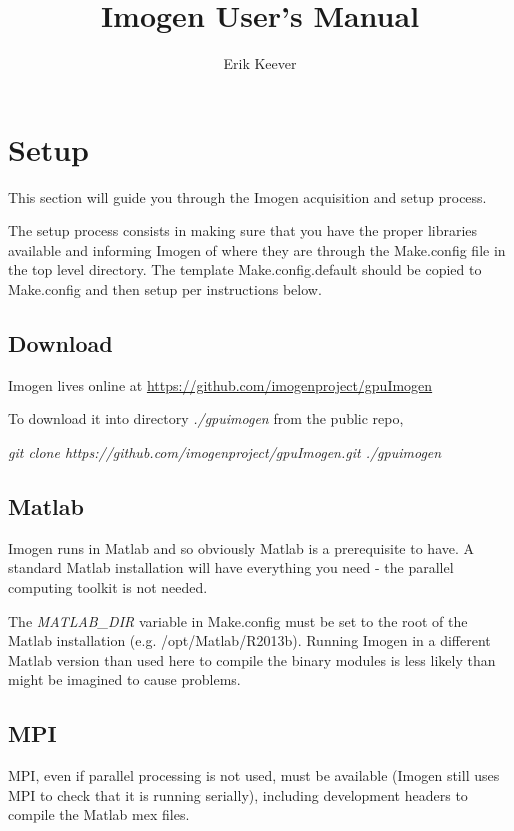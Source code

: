 \documentclass[letterpaper,12pt]{article}
\author{Erik Keever}
\title{Imogen User's Manual}
\begin{document}
 

\maketitle

\section{Setup}

This section will guide you through the Imogen acquisition and setup process.

The setup process consists in making sure that you have the proper libraries
available and informing Imogen of where they are through the Make.config file
in the top level directory. The template Make.config.default should be copied
to Make.config and then setup per instructions below.

\subsection{Download}

Imogen lives online at \url{https://github.com/imogenproject/gpuImogen}

To download it into directory \textit{./gpuimogen} from the public repo,

\textit{ git clone https://github.com/imogenproject/gpuImogen.git ./gpuimogen }

\subsection{Matlab}

Imogen runs in Matlab and so obviously Matlab is a prerequisite to have. A standard
Matlab installation will have everything you need - the parallel computing toolkit
is not needed.

The \textit{MATLAB\_DIR} variable in Make.config must be set to the root of
the Matlab installation (e.g. /opt/Matlab/R2013b). Running Imogen in a different
Matlab version than used here to compile the binary modules is less likely than
might be imagined to cause problems.

\subsection{MPI}

MPI, even if parallel processing is not used, must be available (Imogen still
uses MPI to check that it is running serially), including development headers
to compile the Matlab mex files.
\end{document}
